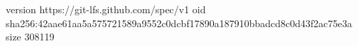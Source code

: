 version https://git-lfs.github.com/spec/v1
oid sha256:42aae61aa5a575721589a9552c0dcbf17890a187910bbadcd8c0d43f2ac75e3a
size 308119
